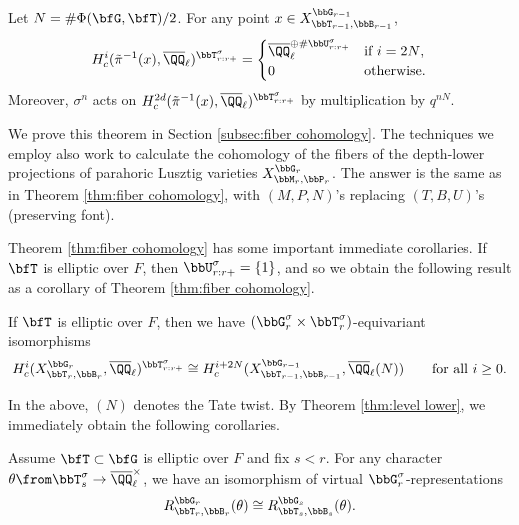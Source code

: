 \begin{theorem}\label{thm:fiber cohomology}
  Let $N = \#\Phi(\bfG,\bfT)/2$. 
  For any point $x \in X_{\bbT_{r-1},\bbB_{r-1}}^{\bbG_{r-1}}$,
  \begin{equation*}
    H_c^i(\tilde \pi^{-1}(x), \overline \QQ_\ell)^{\bbT_{r:r+}^\sigma} = \begin{cases}
      \overline \QQ_\ell^{\oplus \#\bbU_{r:r+}^\sigma} & \text{if $i = 2N$,} \\
      0 & \text{otherwise.}
    \end{cases}
  \end{equation*} 
  Moreover, $\sigma^n$ acts on $H_c^{2d}(\tilde \pi^{-1}(x), \overline \QQ_\ell)^{\bbT_{r:r+}^\sigma}$ by multiplication by $q^{nN}$.
\end{theorem}

We prove this theorem in Section \ref{subsec:fiber cohomology}. The techniques we employ also work to calculate the cohomology of the fibers of the depth-lower projections of parahoric Lusztig varieties $X_{\bbM_r,\bbP_r}^{\bbG_r}$. The answer is the same as in Theorem \ref{thm:fiber cohomology}, with $(M,P,N)$'s replacing $(T,B,U)$'s (preserving font).

Theorem \ref{thm:fiber cohomology} has some important immediate corollaries. If $\bfT$ is elliptic over $F$, then $\bbU_{r:r+}^\sigma = \{1\}$, and so we obtain the following result as a corollary of Theorem \ref{thm:fiber cohomology}.

\begin{theorem}\label{thm:level lower}
  If $\bfT$ is elliptic over $F$, then we have $(\bbG_r^\sigma \times \bbT_r^\sigma)$-equivariant isomorphisms 
  \begin{equation}\label{eq:level lower}
    H_c^i(X_{\bbT_r,\bbB_r}^{\bbG_r}, \overline \QQ_\ell)^{\bbT_{r:r+}^\sigma} \cong H_c^{i+2N}(X_{\bbT_{r-1},\bbB_{r-1}}^{\bbG_{r-1}}, \overline \QQ_\ell(N)) \qquad \text{for all $i \geq 0$}.
  \end{equation}
\end{theorem}

In the above, $(N)$ denotes the Tate twist. By Theorem \ref{thm:level lower}, we immediately obtain the following corollaries.

\begin{corollary}\label{cor:depth compatibility}
  Assume $\bfT \subset \bfG$ is elliptic over $F$ and fix $s < r$. For any character $\theta \from \bbT_s^\sigma \to \overline \QQ_\ell^\times$, we have an isomorphism of virtual $\bbG_r^\sigma$-representations
  \begin{equation*}
    R_{\bbT_r,\bbB_r}^{\bbG_r}(\theta) \cong R_{\bbT_s,\bbB_s}^{\bbG_s}(\theta).
  \end{equation*}
\end{corollary}

